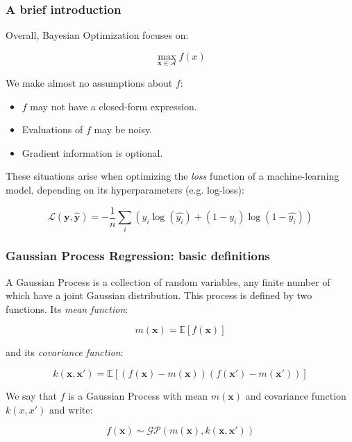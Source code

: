 \documentclass[10pt]{beamer}
\begin{document}
	\begin{frame}
		\frametitle{A brief introduction}
		Overall, Bayesian Optimization focuses on:
		
		\begin{equation}
			\max_{\boldsymbol{x}\in \mathcal{A}} f(x)
		\end{equation}
		
		We make almost no assumptions about $f$:
		\begin{itemize}
			\item $f$ may not have a closed-form expression.
			\item Evaluations of $f$ may be noisy.
			\item Gradient information is optional.
		\end{itemize}
		
		These situations arise when optimizing the \textit{loss} function of a machine-learning model, depending on its hyperparameters (e.g. log-loss):
		
		\begin{equation}
		\mathcal{L}(\boldsymbol{y}, \boldsymbol{\hat{y}}) = -\dfrac{1}{n} \sum_i \left(y_i \log(\hat{y_i}) + (1 - y_i)\log(1-\hat{y_i})\right)
		\end{equation}

	\end{frame}
	
	\begin{frame}
		\frametitle{Gaussian Process Regression: basic definitions}
		\begin{definition}
			A Gaussian Process is a collection of random variables, any finite number of which have a joint Gaussian distribution. This process is defined by two functions. Its \textit{mean function}:
			
			\begin{equation}
m(\boldsymbol{x}) = \mathbb{E}\left[f(\boldsymbol{x})\right]
			\end{equation}
			
			and its \textit{covariance function}:
			
			\begin{equation}
			k(\boldsymbol{x}, \boldsymbol{x'}) = \mathbb{E}\left[\left( f(\boldsymbol{x}) - m(\boldsymbol{x}) \right)\left( f(\boldsymbol{x}') - m(\boldsymbol{x}')\right)\right]
			\end{equation}
			
			We say that $f$ is a Gaussian Process with mean $m(\boldsymbol{x})$ and covariance function $k(x, x')$ and write:
			
			\begin{equation}
			f(\boldsymbol{x}) \sim \mathcal{GP}\left(m(\boldsymbol{x}), k(\boldsymbol{x}, \boldsymbol{x'}) \right)
			\end{equation}
			
			\end{definition}
		\end{frame}
			
\end{document}
